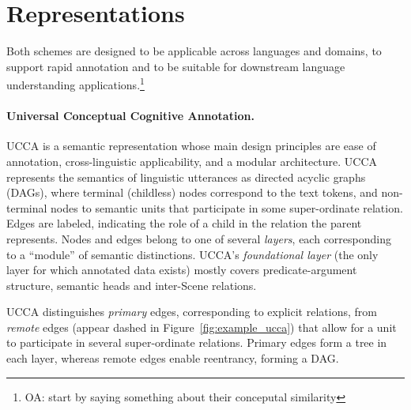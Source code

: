 \documentclass[11pt,a4paper]{article}
\newcommand{\oa}[1]{\footnote{\color{red}OA: #1}}
\begin{document}

\section{Representations}\label{sec:representations}

  Both schemes are designed to be applicable across languages and domains, 
  to support rapid annotation and to be suitable for downstream language understanding applications.\oa{start by saying something about their conceputal similarity}



\paragraph{Universal Conceptual Cognitive Annotation.}\label{sec:ucca}
UCCA \cite{abend2013universal} is a semantic representation whose main design principles
are ease of annotation, cross-linguistic applicability, and a modular architecture.
UCCA represents the semantics of linguistic utterances
as directed acyclic graphs (DAGs), where terminal (childless) nodes
correspond to the text tokens, and non-terminal nodes to semantic units that participate
in some super-ordinate relation.
Edges are labeled, indicating the role of a child in the relation the parent represents.
Nodes and edges belong to one of several \textit{layers}, each corresponding
to a ``module'' of semantic distinctions.
UCCA's \textit{foundational layer} (the only layer for which annotated data exists)
mostly covers predicate-argument structure, semantic heads and inter-Scene relations.

UCCA distinguishes \textit{primary} edges, corresponding 
to explicit relations, from \textit{remote} edges (appear dashed in
Figure~\ref{fig:example_ucca}) that allow for a unit to participate
in several super-ordinate relations.
Primary edges form a tree in each layer, whereas remote edges enable reentrancy, forming a DAG.
\end{document}
